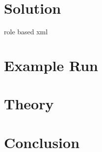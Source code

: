 \section{Solution}
\label{sec_solution}

role based xml





\section{Example Run}
\label{sec_run}


\section{Theory}
\label{sec_theory}


\section{Conclusion}
\label{sec_conclusion}
 